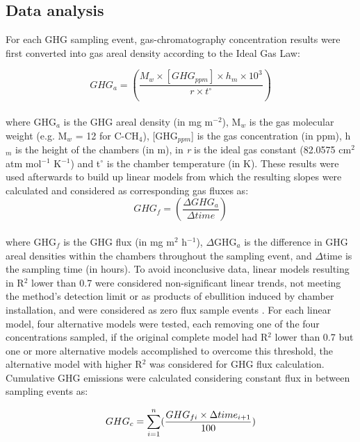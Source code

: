\subsection{Data analysis}
\label{sec:meth_Stat2}

For each GHG sampling event, gas-chromatography concentration results were first converted into gas areal density according to the Ideal Gas Law: 

\begin{equation} \label{GHG_a}
GHG_{a} = (\frac{M_w \times [GHG_{ppm}] \times h_m  \times 10^3}{r  \times t^{\circ}})
\end{equation}\\

where GHG$_{a}$ is the GHG areal density (in mg m$^{-2}$), M$_{w}$ is the gas molecular weight (e.g. M$_{w}$ = 12 for C-CH$_{4}$), [GHG$_{ppm}$] is the gas concentration (in ppm), h$_{m}$ is the height of the chambers (in m), in \textit{r} is the ideal gas constant (82.0575 cm$^{2}$ atm mol$^{-1}$ K$^{-1}$) and t$^{\circ}$ is the chamber temperature (in K). These results were used afterwards to build up linear models from which the resulting slopes were calculated and considered as corresponding gas fluxes as:\\

\begin{equation}
GHG_{f} = (\frac{\Delta GHG_{a}}{\Delta time})
\end{equation}\\

where GHG$_{f}$ is the GHG flux (in mg m$^{2}$ h$^{-1}$), $\Delta$GHG$_{a}$ is the difference in GHG areal densities within the chambers throughout the sampling event, and $\Delta$time is the sampling time (in hours). To avoid inconclusive data, linear models resulting in R$^{2}$ lower than 0.7 were considered non-significant linear trends, not meeting the method's detection limit or as products of ebullition induced by chamber installation, and were considered as zero flux sample events \citep{schultz2023}. For each linear model, four alternative models were tested, each removing one of the four concentrations sampled, if the original complete model had R$^{2}$ lower than 0.7 but one or more alternative models accomplished to overcome this threshold, the alternative model with higher R$^{2}$ was considered for GHG flux calculation. Cumulative GHG emissions were calculated considering constant flux in between sampling events as:

\begin{equation}
GHG_{c} = \sum_{i=1} ^{n}(\frac{GHG_{f\space i} \times \Delta time_{i+1}}{100})
\end{equation}\\

